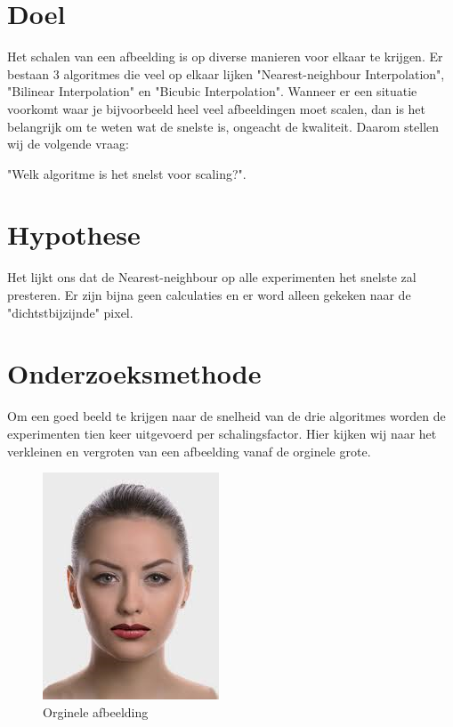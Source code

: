 \documentclass{article}
\begin{document}


\clearpage

\renewcommand{\contentsname}{Inhoudsopgave}
\tableofcontents

\clearpage

\section{Doel}
Het schalen van een afbeelding is op diverse manieren voor elkaar te krijgen. Er bestaan 3 algoritmes die veel op elkaar lijken "Nearest-neighbour Interpolation", "Bilinear Interpolation" en "Bicubic Interpolation". Wanneer er een situatie voorkomt waar je bijvoorbeeld heel veel afbeeldingen moet scalen, dan is het belangrijk om te weten wat de snelste is, ongeacht de kwaliteit. Daarom stellen wij de volgende vraag:

\begin{center}
    "Welk algoritme is het snelst voor scaling?".   
\end{center}

\section{Hypothese}

Het lijkt ons dat de Nearest-neighbour op alle experimenten het snelste zal presteren. Er zijn bijna geen calculaties en er word alleen gekeken naar de "dichtstbijzijnde" pixel. 

\clearpage

\section{Onderzoeksmethode}
Om een goed beeld te krijgen naar de snelheid van de drie algoritmes worden de experimenten tien keer uitgevoerd per schalingsfactor. Hier kijken wij naar het verkleinen en vergroten van een afbeelding vanaf de orginele grote. 

\begin{figure}[H]
    \centering
    \includegraphics{assets/female-3.png}
    \caption{Orginele afbeelding}
    \label{fig:my_label}
\end{figure}
\end{document}
